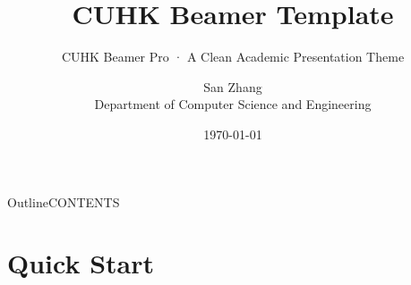 \documentclass[10pt,aspectratio=169]{beamer}
\title{CUHK Beamer Template}
\subtitle{CUHK Beamer Pro · A Clean Academic Presentation Theme}
\author{San Zhang\\[1mm]{\footnotesize Department of Computer Science and Engineering}}
\institute{The Chinese University of Hong Kong}
\date{\today}
\begin{document}
\begin{frame}[plain]
  \titlepage
\end{frame}

\begin{frame}{Outline}{CONTENTS}
  \vspace{2mm}
  \begin{minipage}[t]{0.48\textwidth}
    \vspace{0pt}%
    \tableofcontents[sections={1-2}]
  \end{minipage}\hfill
  \begin{minipage}[t]{0.48\textwidth}
    \vspace{0pt}%
    \tableofcontents[sections={3-4}]
  \end{minipage}
\end{frame}

\section{Quick Start}
\end{document}

